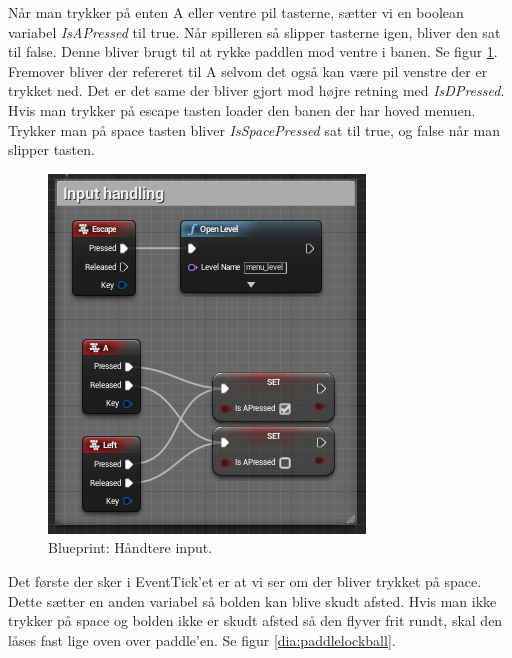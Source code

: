 Når man trykker på enten A eller ventre pil tasterne, sætter vi en boolean variabel \textit{IsAPressed} til true. Når spilleren så slipper tasterne igen, bliver den sat til false. Denne bliver brugt til at rykke paddlen mod ventre i banen. Se figur \ref{dia:paddlehandleinput}. Fremover bliver der refereret til A selvom det også kan være pil venstre der er trykket ned. Det er det same der bliver gjort mod højre retning med \textit{IsDPressed}. Hvis man trykker på escape tasten loader den banen der har hoved menuen. Trykker man på space tasten bliver \textit{IsSpacePressed} sat til true, og false når man slipper tasten.

\begin{figure}
	\begin{center}
		\caption{Blueprint: Håndtere input.}
		\label{dia:paddlehandleinput}
		\includegraphics[width=0.60\linewidth]{pictures/blueprints/paddle-handle-input}
		\end{center}
\end{figure}

Det første der sker i EventTick'et er at vi ser om der bliver trykket på space. Dette sætter en anden variabel så bolden kan blive skudt afsted. Hvis man ikke trykker på space og bolden ikke er skudt afsted så den flyver frit rundt, skal den låses fast lige oven over paddle'en. Se figur \ref{dia:paddlelockball}.

